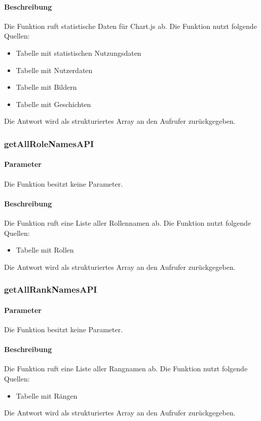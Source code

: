 \paragraph{Beschreibung} Die Funktion ruft statistische Daten für Chart.js ab. Die Funktion nutzt folgende Quellen:
\begin{itemize}
	\item Tabelle mit statistischen Nutzungsdaten
	\item Tabelle mit Nutzerdaten
	\item Tabelle mit Bildern
	\item Tabelle mit Geschichten
\end{itemize}
Die Antwort wird als strukturiertes Array an den Aufrufer zurückgegeben.
\subsubsection{getAllRoleNamesAPI}
\paragraph{Parameter} Die Funktion besitzt keine Parameter.
\paragraph{Beschreibung} Die Funktion ruft eine Liste aller Rollennamen ab. Die Funktion nutzt folgende Quellen:
\begin{itemize}
	\item Tabelle mit Rollen
\end{itemize}
Die Antwort wird als strukturiertes Array an den Aufrufer zurückgegeben.
\subsubsection{getAllRankNamesAPI}
\paragraph{Parameter} Die Funktion besitzt keine Parameter.
\paragraph{Beschreibung} Die Funktion ruft eine Liste aller Rangnamen ab. Die Funktion nutzt folgende Quellen:
\begin{itemize}
	\item Tabelle mit Rängen
\end{itemize}
Die Antwort wird als strukturiertes Array an den Aufrufer zurückgegeben.
